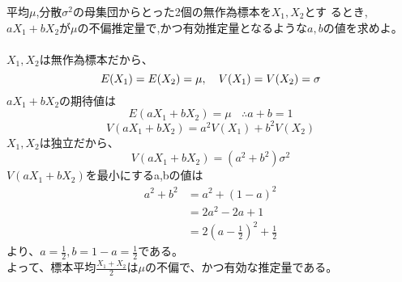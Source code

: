 \documentclass[a4j,uplatex,dvipdfmx]{jsarticle}
\begin{document}
平均$\mu$,分散$\sigma ^2$の母集団からとった2個の無作為標本を$X_1,X_2$とす
るとき,$aX_1+bX_2$が$\mu$の不偏推定量で,かつ有効推定量となるような$a,b$の値を求めよ。\\
\\
$X_1,X_2$は無作為標本だから、
\begin{equation}
  E(X_1)=E(X_2)=\mu,~~~V(X_1)=V(X_2)=\sigma \\
\end{equation}
$aX_1+bX_2$の期待値は
\begin{equation}
  E(aX_1+bX_2)=\mu ~~~~ \therefore a+b=1 
\end{equation}
\begin{equation}
  V(aX_1+bX_2)=a^2 V(X_1)+b^2V(X_2)
\end{equation}
$X_1,X_2$は独立だから、
\begin{equation}
  V(aX_1+bX_2)=(a^2+b^2)\sigma ^2
\end{equation}
$V(aX_1+bX_2)$を最小にするa,bの値は
\begin{equation}
  \begin{split}
    a^2+b^2&=a^2+(1-a)^2\\
    &=2a^2-2a+1\\
    &=2\left( a-\frac{1}{2} \right)^2 + \frac{1}{2}
  \end{split}
\end{equation}
より、$a=\frac{1}{2},b=1-a=\frac{1}{2}$である。\\
よって、標本平均$\frac{X_1+X_2}{2}$は$\mu$の不偏で、かつ有効な推定量である。
\end{document}
